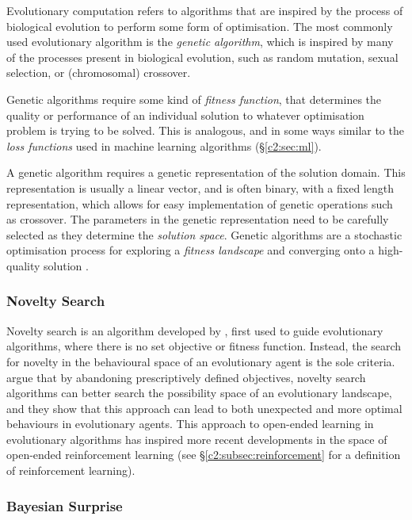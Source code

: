 Evolutionary computation refers to algorithms that are inspired by the process of biological evolution to perform some form of optimisation. 
The most commonly used evolutionary algorithm is the \textit{genetic algorithm}, which is inspired by many of the processes present in biological evolution, such as random mutation, sexual selection, or (chromosomal) crossover.

Genetic algorithms require some kind of \textit{fitness function}, that determines the quality or performance of an individual solution to whatever optimisation problem is trying to be solved. 
This is analogous, and in some ways similar to the \textit{loss functions} used in machine learning algorithms (\S \ref{c2:sec:ml}). 

A genetic algorithm requires a genetic representation of the solution domain. 
This representation is usually a linear vector, and is often binary, with a fixed length representation, which allows for easy implementation of genetic operations such as crossover. 
The parameters in the genetic representation need to be carefully selected as they determine the \textit{solution space}.
Genetic algorithms are a stochastic optimisation process for exploring a \textit{fitness landscape} and converging onto a high-quality solution \citep{back1996evolutionary}.

\subsubsection{Novelty Search}

Novelty search is an algorithm developed by \cite{lehman2008exploiting}, first used to guide evolutionary algorithms, where there is no set objective or fitness function.
Instead, the search for novelty in the behavioural space of an evolutionary agent is the sole criteria. \cite{lehman2010efficiently, lehman2011novelty, lehman2011abandoning} argue that by abandoning prescriptively defined objectives, novelty search algorithms can better search the possibility space of an evolutionary landscape, and they show that this approach can lead to both unexpected and more optimal behaviours in evolutionary agents.
This approach to open-ended learning in evolutionary algorithms has inspired more recent developments in the space of open-ended reinforcement learning \citep{wang2020enhanced} (see \S \ref{c2:subsec:reinforcement} for a definition of reinforcement learning).

\subsubsection{Bayesian Surprise}

